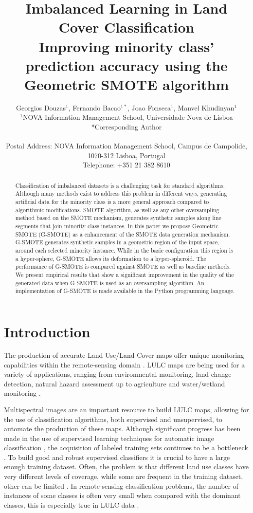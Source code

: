 \documentclass[parskip=full]{scrartcl}
\title{Imbalanced Learning in Land Cover Classification  \\ \LARGE{Improving minority class' prediction accuracy using the Geometric SMOTE algorithm}}
\author{
	Georgios Douzas\(^{1}\), Fernando Bacao\(^{1*}\), Joao Fonseca\(^{1}\), Manvel Khudinyan\(^{1}\)
	\\
	\small{\(^{1}\)NOVA Information Management School, Universidade Nova de Lisboa}
	\\
	\small{*Corresponding Author}
	\\
	\\
	\small{Postal Address: NOVA Information Management School, Campus de Campolide, 1070-312 Lisboa, Portugal}
	\\
	\small{Telephone: +351 21 382 8610}
}
\date{}
\begin{document}
\maketitle

\begin{abstract}
Classification of imbalanced datasets is a challenging task for standard
algorithms. Although many methods exist to address this problem in different
ways, generating artificial data for the minority class is a more general
approach compared to algorithmic modifications. SMOTE algorithm, as well as any
other oversampling method based on the SMOTE mechanism, generates synthetic
samples along line segments that join minority class instances. In this paper we
propose Geometric SMOTE (G-SMOTE) as a enhancement of the SMOTE data generation
mechanism. G-SMOTE generates synthetic samples in a geometric region of the
input space, around each selected minority instance. While in the basic
configuration this region is a hyper-sphere, G-SMOTE allows its deformation to a
hyper-spheroid. The performance of G-SMOTE is compared against SMOTE as well as
baseline methods. We present empirical results that show a significant
improvement in the quality of the generated data when G-SMOTE is used as an
oversampling algorithm. An implementation of G-SMOTE is made available in the
Python programming language.
\end{abstract}

\section{Introduction}

The production of accurate Land Use/Land Cover maps offer unique monitoring
capabilities within the remote-sensing domain \cite{Mellor2015}. LULC maps are
being used for a variety of applications, ranging from environmental
monitoring, land change detection, natural hazard assessment up to agriculture
and water/wetland monitoring \cite{Khatami2016}.

Multispectral images are an important resource to build LULC maps, allowing for
the use of classification algorithms, both supervised and unsupervised, to
automate the production of these maps. Although significant progress has been
made in the use of supervised learning techniques for automatic image
classification \cite{Tewkesbury2015}, the acquisition of labeled training sets
continues to be a bottleneck \cite{Rajan2008}. To build  good and robust
supervised classifiers it is crucial to have a large enough training dataset.
Often, the problem is that different land use classes have very different
levels of coverage, while some are frequent in the training dataset, other can
be limited \cite{Feng2019}. In remote-sensing classification problems, the
number of instances of some classes is often very small when compared with the
dominant classes, this is especially true in LULC data \cite{Williams2009,
Cenggoro2018}.
\end{document}
